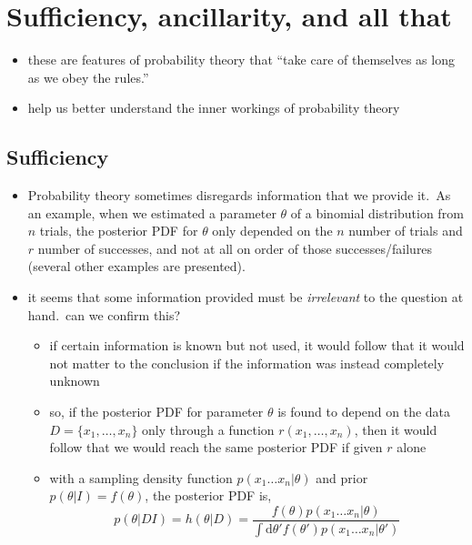 \documentclass[../jaynes_prob_theory_notes.tex]{subfiles}
\begin{document}
    \section{Sufficiency, ancillarity, and all that}
        \begin{itemize}
            \item these are features of probability theory that ``take care of themselves as long as we obey the rules.'' 
            \item help us better understand the inner workings of probability theory
        \end{itemize}

        \subsection{Sufficiency}
            \begin{itemize}
                \item Probability theory sometimes disregards information that we provide it.\ As an example, when we estimated a parameter $\theta$ of a binomial distribution from $n$ trials, the posterior PDF for $\theta$ only depended on the $n$ number of trials and $r$ number of successes, and not at all on order of those successes/failures (several other examples are presented).
                \item it seems that some information provided must be \textit{irrelevant} to the question at hand.\ can we confirm this?
                    \begin{itemize}
                        \item if certain information is known but not used, it would follow that it would not matter to the conclusion if the information was instead completely unknown
                        \item so, if the posterior PDF for parameter $\theta$ is found to depend on the data $D = \{x_1, \ldots, x_n \}$ only through a function $r(x_1, \ldots, x_n)$, then it would follow that we would reach the same posterior PDF if given $r$ alone
                        \item with a sampling density function $p(x_1 \ldots x_n | \theta)$ and prior $p(\theta | I) = f(\theta)$, the posterior PDF is,
                            \begin{equation*}
                                p(\theta | DI) = h(\theta | D) = \frac{f(\theta) p(x_1 \ldots x_n | \theta)}{\int \mathrm{d}{\theta}' f({\theta}') p(x_1 \ldots x_n | {\theta}')}
                            \end{equation*}

\end{itemize}
\end{itemize}
\end{document}
